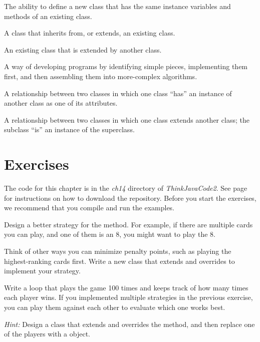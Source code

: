 \begin{description}

The ability to define a new class that has the same instance variables and methods of an existing class.

A class that inherits from, or extends, an existing class.

An existing class that is extended by another class.


A way of developing programs by identifying simple pieces, implementing them first, and then assembling them into more-complex algorithms.

A relationship between two classes in which one class ``has'' an instance of another class as one of its attributes.

A relationship between two classes in which one class extends another class; the subclass ``is'' an instance of the superclass.

\end{description}


\section{Exercises}

The code for this chapter is in the {\it ch14} directory of {\it ThinkJavaCode2}.
See page~\pageref{code} for instructions on how to download the repository.
Before you start the exercises, we recommend that you compile and run the examples.


\begin{exercise}  %

Design a better strategy for the  method.
For example, if there are multiple cards you can play, and one of them is an 8, you might want to play the 8.


Think of other ways you can minimize penalty points, such as playing the highest-ranking cards first.
Write a new class that extends  and overrides  to implement your strategy.

\end{exercise}


\begin{exercise}  %

Write a loop that plays the game 100 times and keeps track of how many times each player wins.
If you implemented multiple strategies in the previous exercise, you can play them against each other to evaluate which one works best.

{\em Hint:} Design a  class that extends  and overrides the  method, and then replace one of the players with a  object.

\end{exercise}


